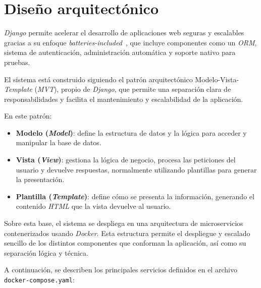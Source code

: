 \section{Diseño arquitectónico}

\textit{Django} permite acelerar el desarrollo de aplicaciones web seguras y escalables gracias a su enfoque \textit{batteries-included}~\cite{web:django_contrib}, que incluye componentes como un \textit{ORM}, sistema de autenticación, administración automática y soporte nativo para pruebas.

El sistema está construido siguiendo el patrón arquitectónico Modelo-Vista-\textit{Template} (\textit{MVT}), propio de \textit{Django}, que permite una separación clara de responsabilidades y facilita el mantenimiento y escalabilidad de la aplicación.

En este patrón:

\begin{itemize}
  \item \textbf{Modelo (\textit{Model})}: define la estructura de datos y la lógica para acceder y manipular la base de datos.
  \item \textbf{Vista (\textit{View})}: gestiona la lógica de negocio, procesa las peticiones del usuario y devuelve respuestas, normalmente utilizando plantillas para generar la presentación.
  \item \textbf{Plantilla (\textit{Template})}: define cómo se presenta la información, generando el contenido \textit{HTML} que la vista devuelve al usuario.
\end{itemize}


Sobre esta base, el sistema se despliega en una arquitectura de microservicios contenerizados usando \textit{Docker}. Esta estructura permite el despliegue y escalado sencillo de los distintos componentes que conforman la aplicación, así como su separación lógica y técnica.

A continuación, se describen los principales servicios definidos en el archivo \texttt{docker-compose.yaml}:

